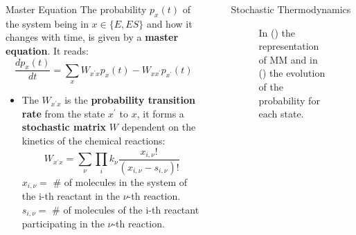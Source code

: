 \documentclass[final]{beamer}
\newlength{\sepwidth}
\newlength{\colwidth}
\newcommand{\separatorcolumn}{\begin{column}{\sepwidth}\end{column}}
\begin{document}
\begin{frame}[t]
\begin{columns}[t]
\begin{column}{\colwidth}
\begin{block}{Master Equation}
The probability $p_x(t)$ of the system being in $x \in \{E,ES\}$ and how it changes with time, is given by a {\bf master equation}\cite{van2007stochastic}. It reads:
%
\begin{equation}
\frac{dp_x(t)}{dt} = \sum_x W_{x^\prime x} p_x(t) -  W_{x x^\prime}p_{x^\prime}(t) \label{eq CME}
\end{equation}
\begin{itemize}
\item The $W_{x^\prime x}$ is the {\bf probability transition rate} from the state $x^\prime$ to $x$, it forms a {\bf stochastic matrix} $W$ dependent on the kinetics of the chemical reactions\cite{GILLESPIE1976403}:
\begin{equation}
W_{x^\prime x} = \sum_\nu \prod_i k_\nu \frac{x_{i,\nu}!}{(x_{i,\nu} - s_{i,\nu})!}
\end{equation}
$x_{i,\nu} = $ \# of molecules in the system of the i-th reactant in the $\nu$-th reaction.\\
$s_{i,\nu} = $ \# of molecules of the i-th reactant participating in the $\nu$-th reaction.
\end{itemize}
\end{block}

\end{column}

\separatorcolumn

\begin{column}{\colwidth}

\begin{block}{Stochastic Thermodynamics}
\begin{figure}
\label{fig 1}
\begin{subfigure}[b]{0.45\textwidth}
\centering

\caption{}
\label{fig 2-state-system}
\end{subfigure}
\begin{subfigure}[b]{0.45\textwidth}
\centering

\caption{}
\label{fig 2-prob-evol}
\end{subfigure}
\caption{In () the representation of MM\cite{esposito2023} and in () the evolution of the probability for each state.}
\end{figure}



\end{block}
\end{column}
\end{columns}
\end{frame}
\end{document}
